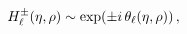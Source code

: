 \[\mathop{{H^{\pm}_{\ell}}\/}\nolimits\!\left(\eta,\rho\right)\sim\mathop{\exp\/%
}\nolimits\!\left(\pm i\mathop{{\theta_{\ell}}\/}\nolimits\!\left(\eta,\rho%
\right)\right),\]